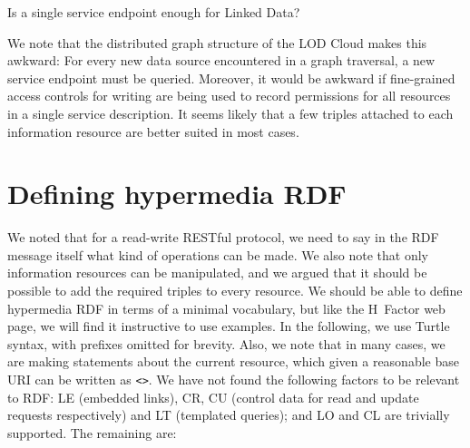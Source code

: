 \documentclass{llncs}
\begin{document}
\begin{question}
Is a single service endpoint enough for Linked Data?
\end{question}

We note that the distributed graph structure of the LOD Cloud makes
this awkward: For every new data source encountered in a graph
traversal, a new service endpoint must be queried. Moreover, it would
be awkward if fine-grained access controls for writing are being used
to record permissions for all resources in a single service
description. It seems likely that a few triples attached to each
information resource are better suited in most cases.

\section{Defining hypermedia RDF}

We noted that for a read-write RESTful protocol, we need to say in the
RDF message itself what kind of operations can be made. We also note
that only information resources can be manipulated, and we argued that
it should be possible to add the required triples to every
resource. We should be able to define hypermedia RDF in terms of a
minimal vocabulary, but like the H~Factor web page, we will find it
instructive to use examples. In the following, we use Turtle syntax,
with prefixes omitted for brevity. Also, we note that in many cases,
we are making statements about the current resource, which given a
reasonable base URI can be written as \texttt{<>}. We have not found
the following factors to be relevant to RDF: \textsf{LE} (embedded
links), \textsf{CR}, \textsf{CU} (control data for read and update
requests respectively) and \textsf{LT} (templated queries); and
\textsf{LO} and \textsf{CL} are trivially supported. The remaining
are:
\end{document}
